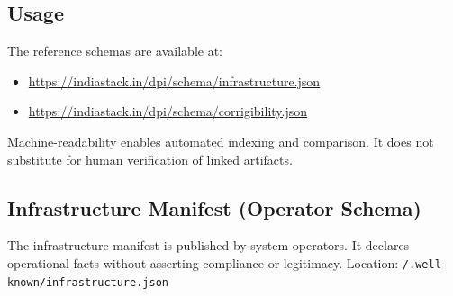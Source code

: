 \documentclass[11pt,a4paper]{article}
\begin{document}
\subsection{Usage}

The reference schemas are available at:

\begin{itemize}
    \item \url{https://indiastack.in/dpi/schema/infrastructure.json}
    \item \url{https://indiastack.in/dpi/schema/corrigibility.json}
\end{itemize}

Machine-readability enables automated indexing and comparison. It does not substitute for human verification of linked artifacts.

\subsection{Infrastructure Manifest (Operator Schema)}

The infrastructure manifest is published by system operators. It declares operational facts without asserting compliance or legitimacy. Location: \texttt{/.well-known/infrastructure.json}
\end{document}
